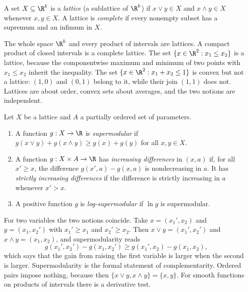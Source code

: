 \begin{definition}[Lattices]\label{def:B-lattice}
A set $X \subseteq \R^k$ is a \emph{lattice} (a sublattice of $\R^k$) if $x \vee y \in X$ and $x \wedge y \in X$ whenever
$x, y \in X$. A lattice is \emph{complete} if every nonempty subset has a supremum and an infimum in $X$.
\end{definition}

The whole space $\R^k$ and every product of intervals are lattices. A compact product of closed intervals is a
complete lattice. The set $\{x \in \R^2 : x_1 \leq x_2\}$ is a lattice, because the componentwise maximum and minimum
of two points with $x_1 \leq x_2$ inherit the inequality. The set $\{x \in \R^2 : x_1 + x_2 \leq 1\}$ is convex but not a
lattice: $(1, 0)$ and $(0, 1)$ belong to it, while their join $(1, 1)$ does not. Lattices are about order, convex
sets about averages, and the two notions are independent.

\begin{definition}\label{def:B-supermodular}
Let $X$ be a lattice and $A$ a partially ordered set of parameters.
\begin{enumerate}[label=(\roman*)]
  \item A function $g : X \to \R$ is \emph{supermodular} if $g(x \vee y) + g(x \wedge y) \geq g(x) + g(y)$ for all
  $x, y \in X$.
  \item A function $g : X \times A \to \R$ has \emph{increasing differences} in $(x, a)$ if, for all $x' \geq x$, the
  difference $g(x', a) - g(x, a)$ is nondecreasing in $a$. It has \emph{strictly increasing differences} if the
  difference is strictly increasing in $a$ whenever $x' > x$.
  \item A positive function $g$ is \emph{log-supermodular} if $\ln g$ is supermodular.
\end{enumerate}
\end{definition}

For two variables the two notions coincide. Take $x = (x_1', x_2)$ and $y = (x_1, x_2')$ with $x_1' \geq x_1$ and
$x_2' \geq x_2$. Then $x \vee y = (x_1', x_2')$ and $x \wedge y = (x_1, x_2)$, and supermodularity reads
\[
  g(x_1', x_2') - g(x_1, x_2') \geq g(x_1', x_2) - g(x_1, x_2),
\]
which says that the gain from raising the first variable is larger when the second is larger. Supermodularity is
the formal statement of complementarity. Ordered pairs impose nothing, because then $\{x \vee y, x \wedge y\} = \{x, y\}$.
For smooth functions on products of intervals there is a derivative test.

